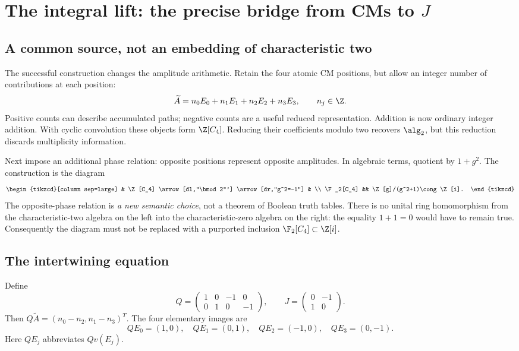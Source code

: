 \section{The integral lift: the precise bridge from CMs to \texorpdfstring{$J$}{J}}\label{sec:lift}
\subsection{A common source, not an embedding of characteristic two}
The successful construction changes the amplitude arithmetic. Retain the four atomic CM positions, but allow an integer number of contributions at each position:
\begin{equation}
 \widetilde A=n_0E_0+n_1E_1+n_2E_2+n_3E_3,
 \qquad n_j\in\Z.
\end{equation}
Positive counts can describe accumulated paths; negative counts are a useful reduced representation. Addition is now ordinary integer addition. With cyclic convolution these objects form $\Z[C_4]$. Reducing their coefficients modulo two recovers $\alg_2$, but this reduction discards multiplicity information.

Next impose an additional phase relation: opposite positions represent opposite amplitudes. In algebraic terms, quotient by $1+g^2$. The construction is the diagram
\begin{equation}\label{eq:commonlift}
 \begin{tikzcd}[column sep=large]
 & \Z[C_4] \arrow[dl,"\bmod 2"'] \arrow[dr,"g^2=-1"] & \\
 \F_2[C_4] && \Z[g]/(g^2+1)\cong\Z[i].
 \end{tikzcd}
\end{equation}
The opposite-phase relation is \emph{a new semantic choice}, not a theorem of Boolean truth tables. There is no unital ring homomorphism from the characteristic-two algebra on the left into the characteristic-zero algebra on the right: the equality $1+1=0$ would have to remain true. Consequently the diagram must not be replaced with a purported inclusion $\F_2[C_4]\subset\Z[i]$.

\subsection{The intertwining equation}
Define
\begin{equation}\label{eq:QJ}
 Q=\begin{pmatrix}1&0&-1&0\\0&1&0&-1\end{pmatrix},\qquad
 J=\begin{pmatrix}0&-1\\1&0\end{pmatrix}.
\end{equation}
Then $Q\widetilde A=(n_0-n_2,n_1-n_3)^T$. The four elementary images are
\begin{equation}
 QE_0=(1,0),\quad QE_1=(0,1),\quad QE_2=(-1,0),\quad QE_3=(0,-1).
\end{equation}
Here $QE_j$ abbreviates $Qv(E_j)$.

